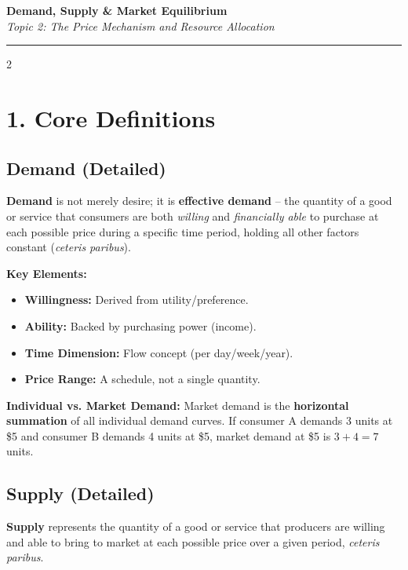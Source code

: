 \documentclass[10pt,a4paper]{article}
\begin{document}
\begin{center}
{\LARGE \textbf{Demand, Supply \& Market Equilibrium}}\\[0.15cm]
{\normalsize \textit{Topic 2: The Price Mechanism and Resource Allocation}}\\[0.15cm]
\hrule
\end{center}
\vspace{-0.3cm}

\begin{multicols}{2}
\footnotesize

\section*{1. Core Definitions}

\subsection*{Demand (Detailed)}
\textbf{Demand} is not merely desire; it is \textbf{effective demand} -- the quantity of a good or service that consumers are both \textit{willing} and \textit{financially able} to purchase at each possible price during a specific time period, holding all other factors constant (\textit{ceteris paribus}).

\textbf{Key Elements:}
\begin{itemize}[leftmargin=*,nosep]
    \item \textbf{Willingness:} Derived from utility/preference.
    \item \textbf{Ability:} Backed by purchasing power (income).
    \item \textbf{Time Dimension:} Flow concept (per day/week/year).
    \item \textbf{Price Range:} A schedule, not a single quantity.
\end{itemize}

\textbf{Individual vs. Market Demand:} Market demand is the \textbf{horizontal summation} of all individual demand curves. If consumer A demands 3 units at \$5 and consumer B demands 4 units at \$5, market demand at \$5 is $3+4=7$ units.

\subsection*{Supply (Detailed)}
\textbf{Supply} represents the quantity of a good or service that producers are willing and able to bring to market at each possible price over a given period, \textit{ceteris paribus}.


\end{multicols}
\end{document}
